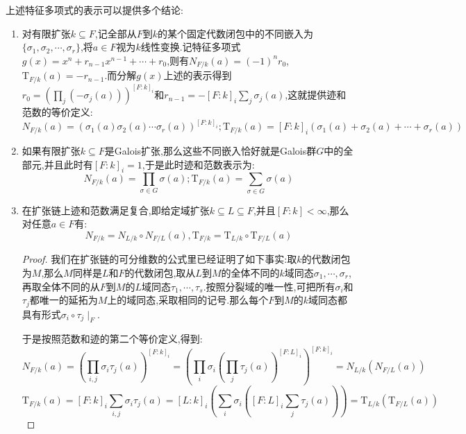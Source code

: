 上述特征多项式的表示可以提供多个结论:
\begin{enumerate}
	\item 对有限扩张$k\subseteq F$,记全部从$F$到$k$的某个固定代数闭包中的不同嵌入为$\{\sigma_1,\sigma_2,\cdots,\sigma_r\}$,将$a\in F$视为$k$线性变换.记特征多项式$g(x)=x^n+r_ {n-1}x^{n-1}+\cdots+r_0$,则有$N_{F/k}(a)=(-1)^nr_0$,$\mathrm{T}_{F/k}(a)=-r_{n-1}$.而分解$g(x)$上述的表示得到$r_0=(\prod_j(-\sigma_j(a)))^{[F:k]_i}$和$r_{n-1}=-[F:k]_i\sum_j\sigma_j(a)$,这就提供迹和范数的等价定义:
	$$N_{F/k}(a)=\left(\sigma_1(a)\sigma_2(a)\cdots\sigma_r(a)\right)^{[F:k]_i};\mathrm{T}_{F/k}(a)=[F:k]_i\left(\sigma_1(a)+\sigma_2(a)+\cdots+\sigma_r(a)\right)$$
	\item 如果有限扩张$k\subseteq F$是Galois扩张,那么这些不同嵌入恰好就是Galois群$G$中的全部元,并且此时有$[F:k]_i=1$,于是此时迹和范数表示为:
	$$N_{F/k}(a)=\prod_{\sigma\in G}\sigma(a);\mathrm{T}_{F/k}(a)=\sum_{\sigma\in G}\sigma(a)$$
	\item 在扩张链上迹和范数满足复合,即给定域扩张$k\subseteq L\subseteq F$,并且$[F:k]<\infty$,那么对任意$a\in F$有:
	$$N_{F/k}=N_{L/k}\circ N_{F/L}(a),\mathrm{T}_{F/k}=\mathrm{T}_{L/k}\circ \mathrm{T}_{F/L}(a)$$
	\begin{proof}
		
	我们在扩张链的可分维数的公式里已经证明了如下事实:取$k$的代数闭包为$M$,那么$M$同样是$L$和$F$的代数闭包,取从$L$到$M$的全体不同的$k$域同态$\sigma_1,\cdots,\sigma_r$,再取全体不同的从$F$到$M$的$L$域同态$\tau_1,\cdots,\tau_s$.按照分裂域的唯一性,可把所有$\sigma_i$和$\tau_j$都唯一的延拓为$M$上的域同态,采取相同的记号.那么每个$F$到$M$的$k$域同态都具有形式$\sigma_i\circ\tau_j\mid_F$.
		
	于是按照范数和迹的第二个等价定义,得到:
	$$N_{F/k}(a)=\left(\prod_{i,j}\sigma_i\tau_j(a)\right)^{[F:k]_i}=\left(\prod_i\sigma_i\left(\prod_j\tau_j(a)\right)^{[F:L]_i}\right)^{[F:k]_i}=N_{L/k}(N_{F/L}(a))$$
	$$\mathrm{T}_{F/k}(a)=[F:k]_i\sum_{i,j}\sigma_i\tau_j(a)=[L:k]_i\left(\sum_i\sigma_i\left([F:L]_i\sum_j\tau_j(a)\right)\right)=\mathrm{T}_{L/k}(\mathrm{T}_{F/L}(a))$$
	\end{proof}
\end{enumerate}

